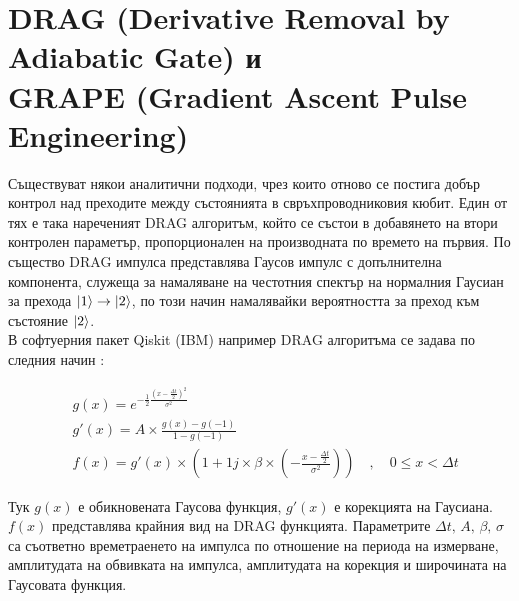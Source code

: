     \section{DRAG (Derivative Removal by Adiabatic Gate) и \\
    GRAPE (Gradient Ascent Pulse Engineering)}

    Съществуват някои аналитични подходи, чрез които отново се постига добър контрол над преходите между състоянията в свръхпроводниковия кюбит. Един от тях е така нареченият DRAG алгоритъм, който се състои в добавянето на втори контролен
    параметър, пропорционален на производната по времето на първия. По същество DRAG импулса представлява Гаусов импулс с допълнителна компонента, служеща за намаляване на честотния спектър на нормалния Гаусиан за прехода $\ket{1} \rightarrow \ket{2}$,
    по този начин намалявайки вероятността за преход към състояние $\ket{2}$.\\
    В софтуерния пакет Qiskit (IBM) например DRAG алгоритъма се задава по следния начин \cite{drag}:

    \begin{align*}
        & g(x) = e^{-\frac{1}{2}\frac{(x-\frac{\Delta t}{2})^2}{\sigma^2}} \\
        & g'(x) =A \times \frac{g(x)-g(-1)}{1-g(-1)} \\
        & f(x) = g'(x) \times \left(1+1j\times\beta\times \left(-\frac{x-\frac{\Delta t}{2}}{\sigma^2}\right)\right) \quad , \quad 0\le x <\Delta t
    \end{align*}

    Тук $g(x)$ е обикновената Гаусова функция, $g'(x)$ е корекцията на Гаусиана. $f(x)$ представлява крайния вид на DRAG функцията. Параметрите $\Delta t, \, A, \, \beta, \, \sigma$ са съответно времетраенето на импулса по отношение на периода на измерване, амплитудата на обвивката на импулса,
    амплитудата на корекция и широчината на Гаусовата функция.

